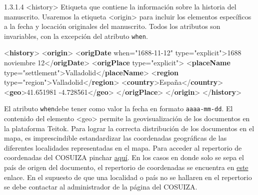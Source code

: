 \documentclass[
]{book}
\newenvironment{Shaded}{\begin{snugshade}}{\end{snugshade}}
\newcommand{\KeywordTok}[1]{\textcolor[rgb]{0.13,0.29,0.53}{\textbf{#1}}}
\newcommand{\NormalTok}[1]{#1}
\newcommand{\OtherTok}[1]{\textcolor[rgb]{0.56,0.35,0.01}{#1}}
\newcommand{\StringTok}[1]{\textcolor[rgb]{0.31,0.60,0.02}{#1}}
\begin{document}
{1.3.1.4 } { \textless history\textgreater{} } Etiqueta que contiene la información sobre la historia del manuscrito.
Usaremos la etiqueta { \textless origin\textgreater{}} para incluir los elementos específicos a la fecha y locación originales del manuscrito. Todos los atributos son invariables, con la excepción del atributo \texttt{when}.

\begin{Shaded}
\begin{Highlighting}[]
\NormalTok{\textless{}}\KeywordTok{history}\NormalTok{\textgreater{} }
\NormalTok{  \textless{}}\KeywordTok{origin}\NormalTok{\textgreater{} }
\NormalTok{    \textless{}}\KeywordTok{origDate}\OtherTok{ when=}\StringTok{"1688{-}11{-}12"}\OtherTok{ type=}\StringTok{"explicit"}\NormalTok{\textgreater{}1688 noviembre 12\textless{}/}\KeywordTok{origDate}\NormalTok{\textgreater{}}
\NormalTok{    \textless{}}\KeywordTok{origPlace}\OtherTok{ type=}\StringTok{"explicit"}\NormalTok{\textgreater{}}
\NormalTok{      \textless{}}\KeywordTok{placeName}\OtherTok{ type=}\StringTok{"settlement"}\NormalTok{\textgreater{}Valladolid\textless{}/}\KeywordTok{placeName}\NormalTok{\textgreater{} }
\NormalTok{      \textless{}}\KeywordTok{region}\OtherTok{ type=}\StringTok{"region"}\NormalTok{\textgreater{}Valladolid\textless{}/}\KeywordTok{region}\NormalTok{\textgreater{} }
\NormalTok{      \textless{}}\KeywordTok{country}\NormalTok{\textgreater{}España\textless{}/}\KeywordTok{country}\NormalTok{\textgreater{} }
\NormalTok{      \textless{}}\KeywordTok{geo}\NormalTok{\textgreater{}41.651981 {-}4.728561\textless{}/}\KeywordTok{geo}\NormalTok{\textgreater{} }
\NormalTok{    \textless{}/}\KeywordTok{origPlace}\NormalTok{\textgreater{}}
\NormalTok{  \textless{}/}\KeywordTok{origin}\NormalTok{\textgreater{}}
\NormalTok{\textless{}/}\KeywordTok{history}\NormalTok{\textgreater{}}
\end{Highlighting}
\end{Shaded}

El atributo \texttt{when}debe tener como valor la fecha en formato \texttt{aaaa-mm-dd}. El contenido del elemento { \textless geo\textgreater{}} permite la geovisualización de los documentos en la plataforma Teitok. Para lograr la correcta distribución de los documentos en el mapa, es imprescindible estandardizar las coordenadas geográficas de las diferentes localidades representadas en el mapa. Para acceder al repertorio de coordenadas del COSUIZA pinchar \href{https://github.com/aescocasti/pro_bookdown/raw/master/coordenadas.xlsx.zip}{aquí}. En los casos en donde solo se sepa el país de origen del documento, el repertorio de coordenadas se encuentra en \href{https://github.com/aescocasti/pro_bookdown/raw/master/coordenadas_paises.xlsx.zip}{este} enlace. En el supuesto de que una localidad o país no se hallaren en el repertorio se debe contactar al administrador de la página del COSUIZA.
\end{document}
